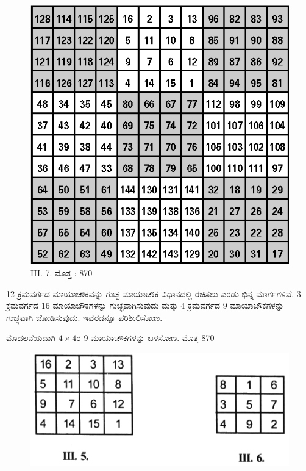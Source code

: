 \begin{figure}[H]
\includegraphics[scale=1.1]{src/figures/chap3/fig3-33.eps}
\caption*{III. 7. ಮೊತ್ತ : 870}
\end{figure}

12 ಕ್ರಮವರ್ಗದ ಮಾಯಾಚೌಕವನ್ನು ಗುಚ್ಛ ಮಾಯಾಚೌಕ ವಿಧಾನದಲ್ಲಿ ರಚಿಸಲು \linebreak ಎರಡು ಭಿನ್ನ ಮಾರ್ಗಗಳಿವೆ. 3 ಕ್ರಮವರ್ಗದ 16 ಮಾಯಾಚೌಕಗಳನ್ನು ಗುಚ್ಛವಾಗಿಸು\-ವುದು ಮತ್ತು 4 ಕ್ರಮವರ್ಗದ 9 ಮಾಯಾಚೌಕಗಳನ್ನು ಗುಚ್ಛವಾಗಿ ಜೋಡಿಸುವುದು. ಇವೆರಡನ್ನೂ ಪರಿಶೀಲಿಸೋಣ.

ಮೊದಲನೆಯದಾಗಿ $4 \times 4$ರ 9 ಮಾಯಾಚೌಕಗಳನ್ನು ಬಳಸೋಣ. ಮೊತ್ತ 870

\begin{figure}[H]
\includegraphics{src/figures/chap3/fig3-34.jpg}
\end{figure}

